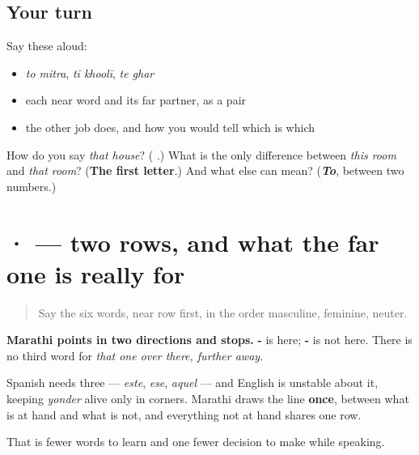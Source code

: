 \subsection*{Your turn}
Say these aloud:

\begin{itemize}
\raggedright
  \item \emph{to mitra}, \emph{tī khoolī}, \emph{te ghar}
  \item each near word and its far partner, as a pair
  \item the other job \textbf{} does, and how you would tell which is which
\end{itemize}

\begin{tcolorbox}[breakable,colback=teal!4,colframe=teal!35!black,title={Before you move on}]
How do you say \emph{that house}? (\emph{\textbf{ }}.) What is the only difference between \emph{this room} and \emph{that room}? (\textbf{The first letter}.) And what else can \textbf{} mean? (\emph{\textbf{To}}, between two numbers.)
\end{tcolorbox}
\section[\texorpdfstring{\mr{हा} · \mr{तो} (hā · to)}{हा · तो (hā · to)}]{ ·  — two rows, and what the far one is really for}

\label{lesson:MR-C69-dem-system}



\begin{quote}
Say the six words, near row first, in the order masculine, feminine, neuter.
\end{quote}

\begin{grammarlens}[title={Grammar Lens: two rows, not three}]
\textbf{Marathi points in two directions and stops.} \textbf{-} is here; \textbf{-} is not here. There is no third word for \emph{that one over there, further away}.

Spanish needs three — \emph{este}, \emph{ese}, \emph{aquel} — and English is unstable about it, keeping \emph{yonder} alive only in corners. Marathi draws the line \textbf{once}, between what is at hand and what is not, and everything not at hand shares one row.

That is fewer words to learn and one fewer decision to make while speaking.
\end{grammarlens}

